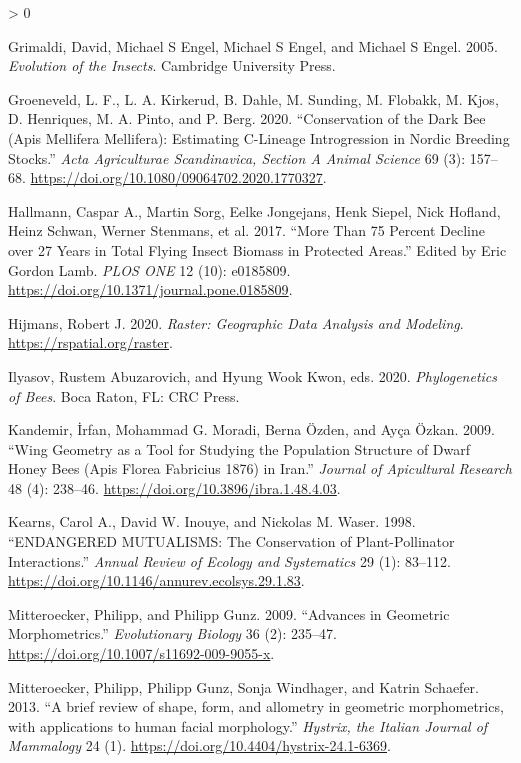 \documentclass[
]{article}
\newlength{\cslhangindent}
\newenvironment{CSLReferences}[2] %
 {%
  \setlength{\parindent}{0pt}
  \ifodd #1 \everypar{\setlength{\hangindent}{\cslhangindent}}\ignorespaces\fi
  \ifnum #2 > 0
  \setlength{\parskip}{#2\baselineskip}
  \fi
 }%
 {}
\begin{document}
\begin{CSLReferences}{1}{0}
\leavevmode\hypertarget{ref-grimaldi2005}{}%
Grimaldi, David, Michael S Engel, Michael S Engel, and Michael S Engel. 2005. \emph{Evolution of the Insects}. Cambridge University Press.

\leavevmode\hypertarget{ref-groeneveld2020}{}%
Groeneveld, L. F., L. A. Kirkerud, B. Dahle, M. Sunding, M. Flobakk, M. Kjos, D. Henriques, M. A. Pinto, and P. Berg. 2020. {``Conservation of the Dark Bee (Apis Mellifera Mellifera): Estimating C-Lineage Introgression in Nordic Breeding Stocks.''} \emph{Acta Agriculturae Scandinavica, Section A {{}} Animal Science} 69 (3): 157--68. \url{https://doi.org/10.1080/09064702.2020.1770327}.

\leavevmode\hypertarget{ref-hallmann2017}{}%
Hallmann, Caspar A., Martin Sorg, Eelke Jongejans, Henk Siepel, Nick Hofland, Heinz Schwan, Werner Stenmans, et al. 2017. {``More Than 75 Percent Decline over 27 Years in Total Flying Insect Biomass in Protected Areas.''} Edited by Eric Gordon Lamb. \emph{PLOS ONE} 12 (10): e0185809. \url{https://doi.org/10.1371/journal.pone.0185809}.

\leavevmode\hypertarget{ref-raster2020}{}%
Hijmans, Robert J. 2020. \emph{Raster: Geographic Data Analysis and Modeling}. \url{https://rspatial.org/raster}.

\leavevmode\hypertarget{ref-phylogen2020}{}%
Ilyasov, Rustem Abuzarovich, and Hyung Wook Kwon, eds. 2020. \emph{Phylogenetics of Bees}. Boca Raton, FL: CRC Press.

\leavevmode\hypertarget{ref-kandemir2009}{}%
Kandemir, İrfan, Mohammad G. Moradi, Berna Özden, and Ayça Özkan. 2009. {``Wing Geometry as a Tool for Studying the Population Structure of Dwarf Honey Bees (Apis Florea Fabricius 1876) in Iran.''} \emph{Journal of Apicultural Research} 48 (4): 238--46. \url{https://doi.org/10.3896/ibra.1.48.4.03}.

\leavevmode\hypertarget{ref-kearns1998}{}%
Kearns, Carol A., David W. Inouye, and Nickolas M. Waser. 1998. {``ENDANGERED MUTUALISMS: The Conservation of Plant-Pollinator Interactions.''} \emph{Annual Review of Ecology and Systematics} 29 (1): 83--112. \url{https://doi.org/10.1146/annurev.ecolsys.29.1.83}.

\leavevmode\hypertarget{ref-mitteroecker2009}{}%
Mitteroecker, Philipp, and Philipp Gunz. 2009. {``Advances in Geometric Morphometrics.''} \emph{Evolutionary Biology} 36 (2): 235--47. \url{https://doi.org/10.1007/s11692-009-9055-x}.

\leavevmode\hypertarget{ref-mitteroecker2013}{}%
Mitteroecker, Philipp, Philipp Gunz, Sonja Windhager, and Katrin Schaefer. 2013. {``A brief review of shape, form, and allometry in geometric morphometrics, with applications to human facial morphology.''} \emph{Hystrix, the Italian Journal of Mammalogy} 24 (1). \url{https://doi.org/10.4404/hystrix-24.1-6369}.


\end{CSLReferences}
\end{document}
